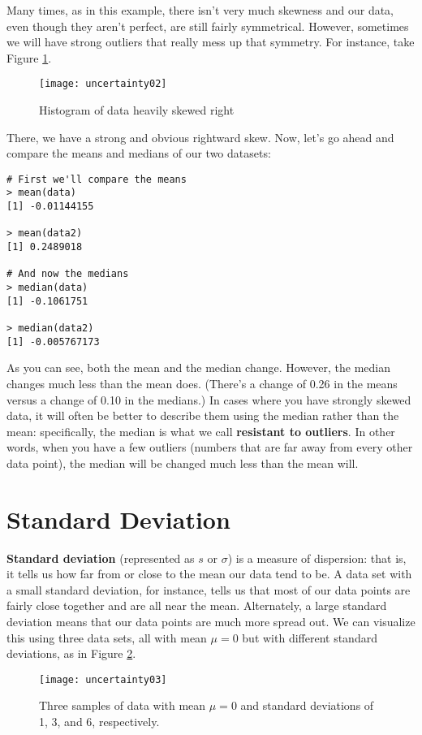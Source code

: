 Many times, as in this example, there isn't very much skewness and our data, even though they aren't perfect, are still fairly symmetrical. However, sometimes we will have strong outliers that really mess up that symmetry. For instance, take Figure \ref{fig:uncertainty02}.

\begin{figure}[h]
\texttt{[image: uncertainty02]}
\caption{Histogram of data heavily skewed right}
\label{fig:uncertainty02}
\end{figure}
\clearpage
There, we have a strong and obvious rightward skew. Now, let's go ahead and compare the means and medians of our two datasets:

\begin{Verbatim}[samepage=TRUE]
# First we'll compare the means
> mean(data)
[1] -0.01144155
 
> mean(data2)
[1] 0.2489018
 
# And now the medians
> median(data)
[1] -0.1061751
 
> median(data2)
[1] -0.005767173
\end{Verbatim}

As you can see, both the mean and the median change. However, the median changes much less than the mean does. (There's a change of 0.26 in the means versus a change of 0.10 in the medians.) In cases where you have strongly skewed data, it will often be better to describe them using the median rather than the mean: specifically, the median is what we call \textbf{resistant to outliers}. In other words, when you have a few outliers (numbers that are far away from every other data point), the median will be changed much less than the mean will.

\section{Standard Deviation}
\textbf{Standard deviation} (represented as $s$ or $\sigma$) is a measure of dispersion: that is, it tells us how far from or close to the mean our data tend to be. A data set with a small standard deviation, for instance, tells us that most of our data points are fairly close together and are all near the mean. Alternately, a large standard deviation means that our data points are much more spread out. We can visualize this using three data sets, all with mean $\mu=0$ but with different standard deviations, as in Figure \ref{fig:uncertainty03}.

\begin{figure}[h]
\texttt{[image: uncertainty03]}
\caption{Three samples of data with mean \(\mu=0\) and standard deviations of 1, 3, and 6, respectively.}
\label{fig:uncertainty03}
\end{figure}

